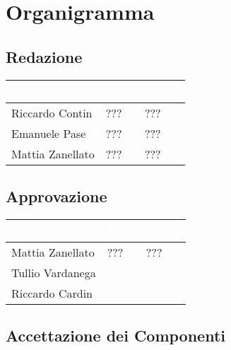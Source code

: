 \chapter{Organigramma}
\renewcommand\arraystretch{2,5}

\section{Redazione}

\begin{table}[H]
  \centering
  \begin{tabular}{|C{3,5cm}C{2cm}C{6,5cm}|}
    \hline
    \textcolor[HTML]{FFFFFF}{\textbf{Nominativo}} & \textcolor[HTML]{FFFFFF}{\textbf{Data}} & \textcolor[HTML]{FFFFFF}{\textbf{Firma}} \\ \hline
    Riccardo Contin & ??? & ??? \\ \hline
    Emanuele Pase & ??? & ??? \\ \hline
    Mattia Zanellato & ??? & ??? \\ \hline
  \end{tabular}
\end{table}


\section{Approvazione}

\begin{table}[H]
  \centering
  \begin{tabular}{|C{3,5cm}C{2cm}C{6,5cm}|}
    \hline
    \textcolor[HTML]{FFFFFF}{\textbf{Nominativo}} & \textcolor[HTML]{FFFFFF}{\textbf{Data}} & \textcolor[HTML]{FFFFFF}{\textbf{Firma}} \\ \hline
    Mattia Zanellato & ??? & ??? \\ \hline
    Tullio Vardanega &  &  \\ \hline
    Riccardo Cardin &  &  \\ \hline
  \end{tabular}
\end{table}


\section{Accettazione dei Componenti}


